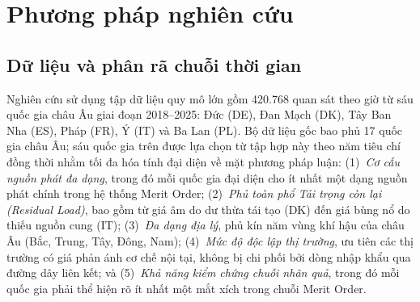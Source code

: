 
\section{Phương pháp nghiên cứu}

\subsection{Dữ liệu và phân rã chuỗi thời gian}

Nghiên cứu sử dụng tập dữ liệu quy mô lớn gồm 420.768 quan sát theo giờ từ sáu quốc gia châu Âu giai đoạn 2018--2025: Đức (DE), Đan Mạch (DK), Tây Ban Nha (ES), Pháp (FR), Ý (IT) và Ba Lan (PL). Bộ dữ liệu gốc bao phủ 17 quốc gia châu Âu; sáu quốc gia trên được lựa chọn từ tập hợp này theo năm tiêu chí đồng thời nhằm tối đa hóa tính đại diện về mặt phương pháp luận: (1)~\textit{Cơ cấu nguồn phát đa dạng}, trong đó mỗi quốc gia đại diện cho ít nhất một dạng nguồn phát chính trong hệ thống Merit Order; (2)~\textit{Phủ toàn phổ Tải trọng còn lại (Residual Load)}, bao gồm từ giá âm do dư thừa tái tạo (DK) đến giá bùng nổ do thiếu nguồn cung (IT); (3)~\textit{Đa dạng địa lý}, phủ kín năm vùng khí hậu của châu Âu (Bắc, Trung, Tây, Đông, Nam); (4)~\textit{Mức độ độc lập thị trường}, ưu tiên các thị trường có giá phản ánh cơ chế nội tại, không bị chi phối bởi dòng nhập khẩu qua đường dây liên kết; và (5)~\textit{Khả năng kiểm chứng chuỗi nhân quả}, trong đó mỗi quốc gia phải thể hiện rõ ít nhất một mắt xích trong chuỗi Merit Order.

